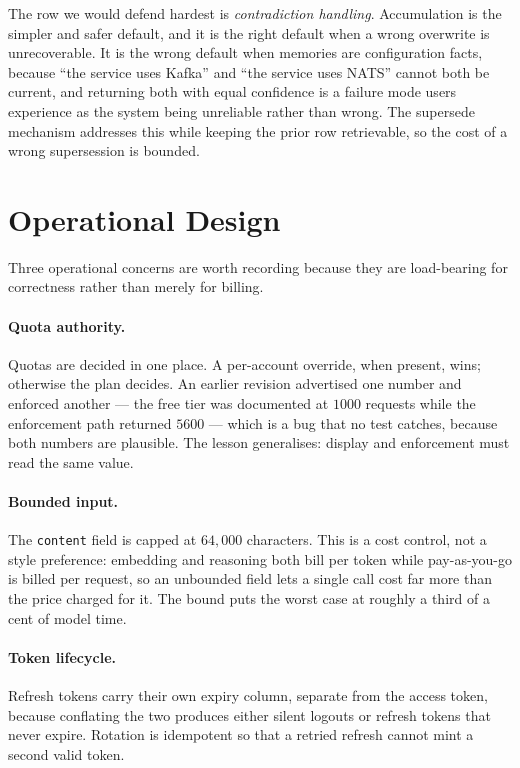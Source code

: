 \documentclass[10pt,twocolumn]{article}
\begin{document}
The row we would defend hardest is \emph{contradiction handling}. Accumulation is
the simpler and safer default, and it is the right default when a wrong
overwrite is unrecoverable. It is the wrong default when memories are
configuration facts, because ``the service uses Kafka'' and ``the service uses
NATS'' cannot both be current, and returning both with equal confidence is a
failure mode users experience as the system being unreliable rather than wrong.
The supersede mechanism addresses this while keeping the prior row retrievable,
so the cost of a wrong supersession is bounded.

\section{Operational Design}
\label{sec:ops}

Three operational concerns are worth recording because they are load-bearing for
correctness rather than merely for billing.

\paragraph{Quota authority.}
Quotas are decided in one place. A per-account override, when present, wins;
otherwise the plan decides. An earlier revision advertised one number and
enforced another --- the free tier was documented at $1000$ requests while the
enforcement path returned $5600$ --- which is a bug that no test catches,
because both numbers are plausible. The lesson generalises: display and
enforcement must read the same value.

\paragraph{Bounded input.}
The \texttt{content} field is capped at $64{,}000$ characters. This is a cost
control, not a style preference: embedding and reasoning both bill per token
while pay-as-you-go is billed per request, so an unbounded field lets a single
call cost far more than the price charged for it. The bound puts the worst case
at roughly a third of a cent of model time.

\paragraph{Token lifecycle.}
Refresh tokens carry their own expiry column, separate from the access token,
because conflating the two produces either silent logouts or refresh tokens that
never expire. Rotation is idempotent so that a retried refresh cannot mint a
second valid token.
\end{document}
